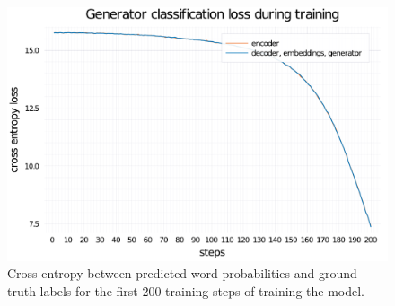 \begin{figure}
    \centering
    \includegraphics[width=0.7\linewidth]{training-loss-transformer-abs-tiny.pdf}
    \caption{Cross entropy between predicted word probabilities and ground truth labels for the first 200 training steps of training the \TransformerAbsTiny model.}
    \label{training-loss-transformer-abs}
\end{figure}
